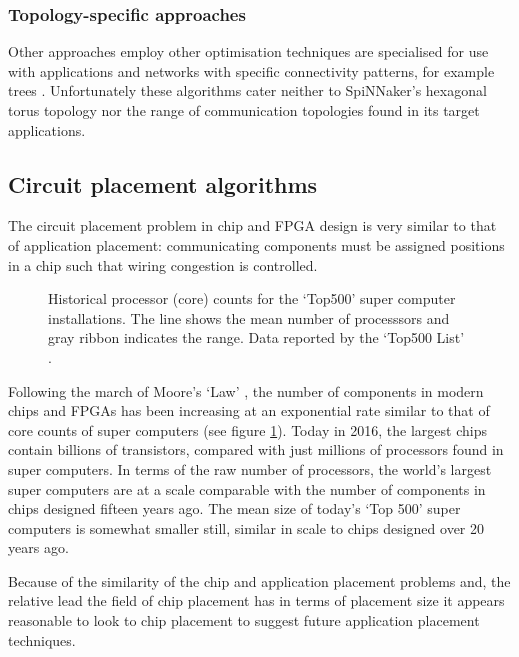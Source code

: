 			\subsubsection{Topology-specific approaches}
				
				Other approaches employ other optimisation techniques are specialised
				for use with applications and networks with specific connectivity
				patterns, for example trees \cite{jeannot14,traff02}. Unfortunately
				these algorithms cater neither to SpiNNaker's hexagonal torus topology
				nor the range of communication topologies found in its target
				applications.
	
		\subsection{Circuit placement algorithms}
			
			The circuit placement problem in chip and FPGA design is very similar to
			that of application placement: communicating components must be assigned
			positions in a chip such that wiring congestion is controlled.
			
			\begin{figure}
				\center
				
				\caption{Historical processor (core) counts for the `Top500' super
				computer installations. The line shows the mean number of processsors and
				gray ribbon indicates the range. Data reported by the `Top500 List'
				\cite{meuer16j}.}
				\label{fig:top500-num-processors}
			\end{figure}
			
			Following the march of Moore's `Law' \cite{moore65,moore75}, the number
			of components in modern chips and FPGAs has been increasing at an
			exponential rate similar to that of core counts of super computers (see
			figure \ref{fig:top500-num-processors}). Today in 2016, the largest chips
			contain billions of transistors, compared with just millions of
			processors found in super computers. In terms of the raw number of
			processors, the world's largest super computers are at a scale comparable
			with the number of components in chips designed fifteen years ago. The
			mean size of today's `Top 500' super computers is somewhat smaller still,
			similar in scale to chips designed over 20 years ago.
			
			Because of the similarity of the chip and application placement problems
			and, the relative lead the field of chip placement has in terms of
			placement size it appears reasonable to look to chip placement to suggest
			future application placement techniques.
			
